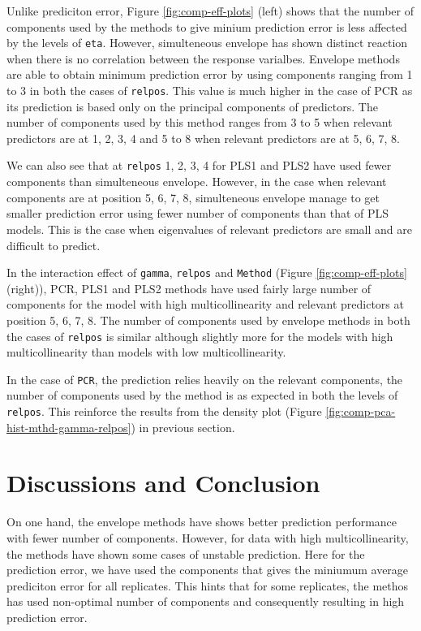 \documentclass[12pt,3p,authoryear]{elsarticle}
\begin{document}
Unlike prediciton error, Figure \ref{fig:comp-eff-plots} (left) shows
that the number of components used by the methods to give minium
prediction error is less affected by the levels of \texttt{eta}.
However, simulteneous envelope has shown distinct reaction when there is
no correlation between the response varialbes. Envelope methods are able
to obtain minimum prediction error by using components ranging from 1 to
3 in both the cases of \texttt{relpos}. This value is much higher in the
case of PCR as its prediction is based only on the principal components
of predictors. The number of components used by this method ranges from
3 to 5 when relevant predictors are at 1, 2, 3, 4 and 5 to 8 when
relevant predictors are at 5, 6, 7, 8.

We can also see that at \texttt{relpos} 1, 2, 3, 4 for PLS1 and PLS2
have used fewer components than simulteneous envelope. However, in the
case when relevant components are at position 5, 6, 7, 8, simulteneous
envelope manage to get smaller prediction error using fewer number of
components than that of PLS models. This is the case when eigenvalues of
relevant predictors are small and are difficult to predict.

In the interaction effect of \texttt{gamma}, \texttt{relpos} and
\texttt{Method} (Figure \ref{fig:comp-eff-plots} (right)), PCR, PLS1 and
PLS2 methods have used fairly large number of components for the model
with high multicollinearity and relevant predictors at position 5, 6, 7,
8. The number of components used by envelope methods in both the cases
of \texttt{relpos} is similar although slightly more for the models with
high multicollinearity than models with low multicollinearity.

In the case of \texttt{PCR}, the prediction relies heavily on the
relevant components, the number of components used by the method is as
expected in both the levels of \texttt{relpos}. This reinforce the
results from the density plot (Figure
\ref{fig:comp-pca-hist-mthd-gamma-relpos}) in previous section.

\section{Discussions and Conclusion}\label{discussions-and-conclusion}

On one hand, the envelope methods have shows better prediction
performance with fewer number of components. However, for data with high
multicollinearity, the methods have shown some cases of unstable
prediction. Here for the prediction error, we have used the components
that gives the miniumum average prediciton error for all replicates.
This hints that for some replicates, the methos has used non-optimal
number of components and consequently resulting in high prediction
error.
\end{document}
